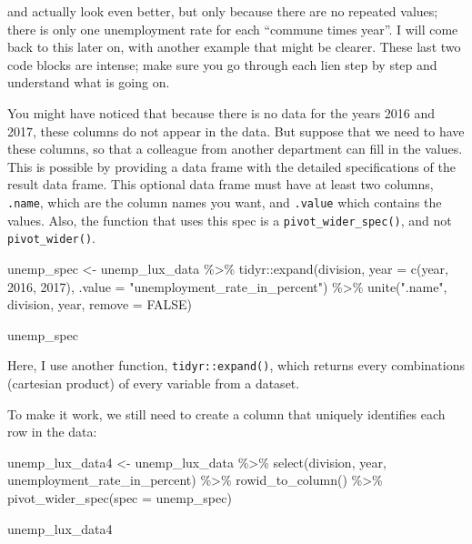 \documentclass[
]{article}
\newenvironment{Shaded}{\begin{snugshade}}{\end{snugshade}}
\newcommand{\AttributeTok}[1]{\textcolor[rgb]{0.77,0.63,0.00}{#1}}
\newcommand{\ConstantTok}[1]{\textcolor[rgb]{0.00,0.00,0.00}{#1}}
\newcommand{\DecValTok}[1]{\textcolor[rgb]{0.00,0.00,0.81}{#1}}
\newcommand{\FunctionTok}[1]{\textcolor[rgb]{0.00,0.00,0.00}{#1}}
\newcommand{\NormalTok}[1]{#1}
\newcommand{\OtherTok}[1]{\textcolor[rgb]{0.56,0.35,0.01}{#1}}
\newcommand{\SpecialCharTok}[1]{\textcolor[rgb]{0.00,0.00,0.00}{#1}}
\newcommand{\StringTok}[1]{\textcolor[rgb]{0.31,0.60,0.02}{#1}}
\begin{document}
and actually look even better, but only because there are no repeated values; there is only one
unemployment rate for each ``commune times year''. I will come back to this later on, with another
example that might be clearer. These last two code blocks are intense; make sure you go through
each lien step by step and understand what is going on.

You might have noticed that because there is no data for the years 2016 and 2017, these columns do
not appear in the data. But suppose that we need to have these columns, so that a colleague from
another department can fill in the values. This is possible by providing a data frame with the
detailed specifications of the result data frame. This optional data frame must have at least two
columns, \texttt{.name}, which are the column names you want, and \texttt{.value} which contains the values.
Also, the function that uses this spec is a \texttt{pivot\_wider\_spec()}, and not \texttt{pivot\_wider()}.

\begin{Shaded}
\begin{Highlighting}[]
\NormalTok{unemp\_spec }\OtherTok{\textless{}{-}}\NormalTok{ unemp\_lux\_data }\SpecialCharTok{\%\textgreater{}\%} 
\NormalTok{  tidyr}\SpecialCharTok{::}\FunctionTok{expand}\NormalTok{(division,}
         \AttributeTok{year =} \FunctionTok{c}\NormalTok{(year, }\DecValTok{2016}\NormalTok{, }\DecValTok{2017}\NormalTok{),}
         \AttributeTok{.value =} \StringTok{"unemployment\_rate\_in\_percent"}\NormalTok{) }\SpecialCharTok{\%\textgreater{}\%}
  \FunctionTok{unite}\NormalTok{(}\StringTok{".name"}\NormalTok{, division, year, }\AttributeTok{remove =} \ConstantTok{FALSE}\NormalTok{)}

\NormalTok{unemp\_spec}
\end{Highlighting}
\end{Shaded}

Here, I use another function, \texttt{tidyr::expand()}, which returns every combinations (cartesian product)
of every variable from a dataset.

To make it work, we still need to create a column that uniquely identifies each row in the data:

\begin{Shaded}
\begin{Highlighting}[]
\NormalTok{unemp\_lux\_data4 }\OtherTok{\textless{}{-}}\NormalTok{ unemp\_lux\_data }\SpecialCharTok{\%\textgreater{}\%} 
  \FunctionTok{select}\NormalTok{(division, year, unemployment\_rate\_in\_percent) }\SpecialCharTok{\%\textgreater{}\%} 
  \FunctionTok{rowid\_to\_column}\NormalTok{() }\SpecialCharTok{\%\textgreater{}\%} 
  \FunctionTok{pivot\_wider\_spec}\NormalTok{(}\AttributeTok{spec =}\NormalTok{ unemp\_spec) }

\NormalTok{unemp\_lux\_data4}
\end{Highlighting}
\end{Shaded}
\end{document}
